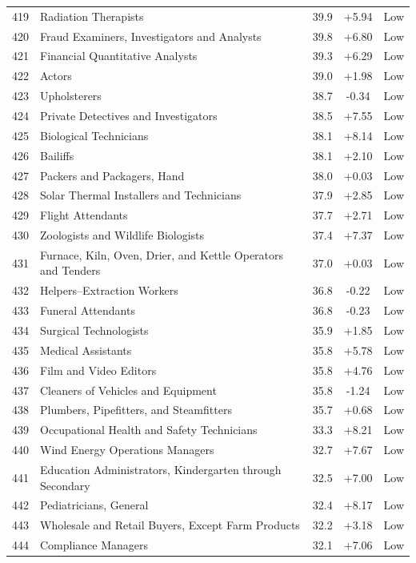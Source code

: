 {\begin{longtable}{rp{7cm}ccc}
419 & Radiation Therapists & 39.9 & +5.94 & Low \\
420 & Fraud Examiners, Investigators and Analysts & 39.8 & +6.80 & Low \\
421 & Financial Quantitative Analysts & 39.3 & +6.29 & Low \\
422 & Actors & 39.0 & +1.98 & Low \\
423 & Upholsterers & 38.7 & -0.34 & Low \\
424 & Private Detectives and Investigators & 38.5 & +7.55 & Low \\
425 & Biological Technicians & 38.1 & +8.14 & Low \\
426 & Bailiffs & 38.1 & +2.10 & Low \\
427 & Packers and Packagers, Hand & 38.0 & +0.03 & Low \\
428 & Solar Thermal Installers and Technicians & 37.9 & +2.85 & Low \\
429 & Flight Attendants & 37.7 & +2.71 & Low \\
430 & Zoologists and Wildlife Biologists & 37.4 & +7.37 & Low \\
431 & Furnace, Kiln, Oven, Drier, and Kettle Operators and Tenders & 37.0 & +0.03 & Low \\
432 & Helpers--Extraction Workers & 36.8 & -0.22 & Low \\
433 & Funeral Attendants & 36.8 & -0.23 & Low \\
434 & Surgical Technologists & 35.9 & +1.85 & Low \\
435 & Medical Assistants & 35.8 & +5.78 & Low \\
436 & Film and Video Editors & 35.8 & +4.76 & Low \\
437 & Cleaners of Vehicles and Equipment & 35.8 & -1.24 & Low \\
438 & Plumbers, Pipefitters, and Steamfitters & 35.7 & +0.68 & Low \\
439 & Occupational Health and Safety Technicians & 33.3 & +8.21 & Low \\
440 & Wind Energy Operations Managers & 32.7 & +7.67 & Low \\
441 & Education Administrators, Kindergarten through Secondary & 32.5 & +7.00 & Low \\
442 & Pediatricians, General & 32.4 & +8.17 & Low \\
443 & Wholesale and Retail Buyers, Except Farm Products & 32.2 & +3.18 & Low \\
444 & Compliance Managers & 32.1 & +7.06 & Low \\

\end{longtable}}
